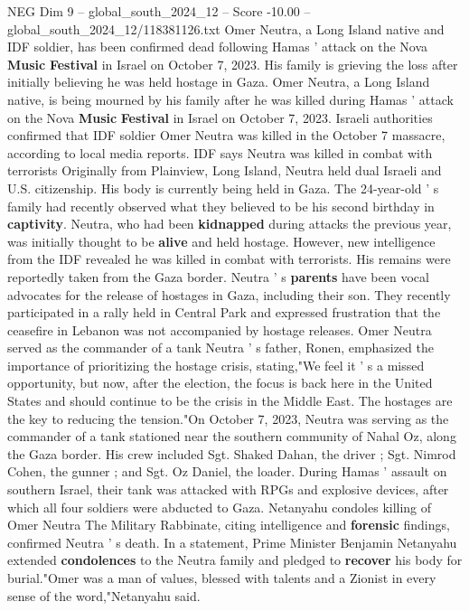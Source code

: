 \begin{textsample}{NEG Dim 9 – global\_south\_2024\_12 – Score -10.00 – global\_south\_2024\_12/118381126.txt}  \label{ex:f9_neg_211}
Omer Neutra, a Long Island native and IDF soldier, has been confirmed dead following Hamas ' attack on the Nova \textbf{Music} \textbf{Festival} in Israel on October 7, 2023.
His family is grieving the loss after initially believing he was held hostage in Gaza.
Omer Neutra, a Long Island native, is being mourned by his family after he was killed during Hamas ' attack on the Nova \textbf{Music} \textbf{Festival} in Israel on October 7, 2023.
Israeli authorities confirmed that IDF soldier Omer Neutra was killed in the October 7 massacre, according to local media reports.
IDF says Neutra was killed in combat with terrorists Originally from Plainview, Long Island, Neutra held dual Israeli and U.S. citizenship.
His body is currently being held in Gaza.
The 24-year-old ' s family had recently observed what they believed to be his second birthday in \textbf{captivity}.
Neutra, who had been \textbf{kidnapped} during attacks the previous year, was initially thought to be \textbf{alive} and held hostage.
However, new intelligence from the IDF revealed he was killed in combat with terrorists.
His remains were reportedly taken from the Gaza border.
Neutra ' s \textbf{parents} have been vocal advocates for the release of hostages in Gaza, including their son.
They recently participated in a rally held in Central Park and expressed frustration that the ceasefire in Lebanon was not accompanied by hostage releases.
Omer Neutra served as the commander of a tank Neutra ' s father, Ronen, emphasized the importance of prioritizing the hostage crisis, stating,"We feel it ' s a missed opportunity, but now, after the election, the focus is back here in the United States and should continue to be the crisis in the Middle East.
The hostages are the key to reducing the tension."On October 7, 2023, Neutra was serving as the commander of a tank stationed near the southern community of Nahal Oz, along the Gaza border.
His crew included Sgt.
Shaked Dahan, the driver ; Sgt.
Nimrod Cohen, the gunner ; and Sgt.
Oz Daniel, the loader.
During Hamas ' assault on southern Israel, their tank was attacked with RPGs and explosive devices, after which all four soldiers were abducted to Gaza.
Netanyahu condoles killing of Omer Neutra The Military Rabbinate, citing intelligence and \textbf{forensic} findings, confirmed Neutra ' s death.
In a statement, Prime Minister Benjamin Netanyahu extended \textbf{condolences} to the Neutra family and pledged to \textbf{recover} his body for burial."Omer was a man of values, blessed with talents and a Zionist in every sense of the word,"Netanyahu said.

\end{textsample}
